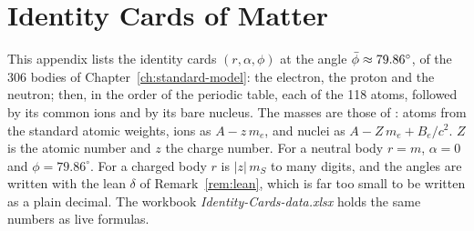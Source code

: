 \chapter{Identity Cards of Matter}\label{app:identity-cards}

This appendix lists the identity cards $(r, \alpha, \phi)$ at the angle $\bar{\phi} \approx 79.86^\circ$, of the 306 bodies of Chapter~\ref{ch:standard-model}: the electron, the proton and the neutron; then, in the order of the periodic table, each of the 118 atoms, followed by its common ions and by its bare nucleus. The masses are those of : atoms from the standard atomic weights, ions as $A - z\,m_e$, and nuclei as $A - Z\,m_e + B_e/c^2$. $Z$ is the atomic number and $z$ the charge number. For a neutral body $r = m$, $\alpha = 0$ and $\phi = 79.86^\circ$. For a charged body $r$ is $|z|\,m_S$ to many digits, and the angles are written with the lean $\delta$ of Remark~\ref{rem:lean}, which is far too small to be written as a plain decimal. The workbook \emph{Identity-Cards-data.xlsx} holds the same numbers as live formulas.

\bigskip

